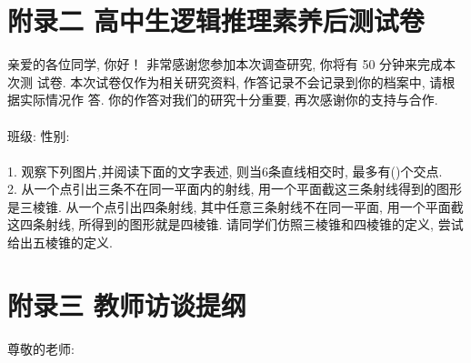 \section*{附录二 \quad 高中生逻辑推理素养后测试卷}\label{fulu2}
\renewcommand\theequation{1.\arabic{equation}}
\renewcommand\thefigure{1.-\arabic{figure}}
\renewcommand\thetable{1.\arabic{table}}
\setcounter{equation}{0}
\setcounter{figure}{0}
\setcounter{table}{0}
亲爱的各位同学, 你好！ 非常感谢您参加本次调查研究, 你将有 50 分钟来完成本次测
试卷. 本次试卷仅作为相关研究资料, 作答记录不会记录到你的档案中, 请根据实际情况作
答. 你的作答对我们的研究十分重要, 再次感谢你的支持与合作.\\
\\
班级:    \underline{ \qquad  \qquad \qquad }        \qquad  \qquad \qquad             性别:  \underline{ \qquad  \qquad \qquad }    \\
\\  
1. 观察下列图片,并阅读下面的文字表述, 则当6条直线相交时, 最多有(\quad)个交点.\\
 
2. 从一个点引出三条不在同一平面内的射线, 用一个平面截这三条射线得到的图形是三棱锥. 从一个点引出四条射线, 其中任意三条射线不在同一平面, 用一个平面截这四条射线, 所得到的图形就是四棱锥. 请同学们仿照三棱锥和四棱锥的定义, 尝试给出五棱锥的定义.\\
 


\section*{附录三 \quad 教师访谈提纲}\label{fulu2}
\renewcommand\theequation{1.\arabic{equation}}
\renewcommand\thefigure{1.-\arabic{figure}}
\renewcommand\thetable{1.\arabic{table}}
\setcounter{equation}{0}
\setcounter{figure}{0}
\setcounter{table}{0}
 
 
尊敬的老师:

